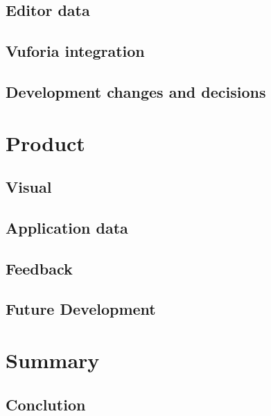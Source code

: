 \documentclass[BSP,english,oneside]{classes/gucthesis}
\begin{document}
	\section{Editor data}
		\label{sec:editor_data}
		

	\section{Vuforia integration}
		\label{sec:AR_library_integration}
		

	\section{Development changes and decisions}
		\label{sec:Developmentchangesanddecisions}
		


\chapter{Product}
	\label{chap:product}

	\section{Visual}
		\label{sec:visual}
		

	\section{Application data}
		\label{sec:application_data}
		

	\section{Feedback}
		\label{sec:feedback}
		

	\section{Future Development}
		\label{sec:future_development}
		


\chapter{Summary}
	\label{chap:summary}

	\section{Conclution}
		\label{sec:conclution}
		
\end{document}
